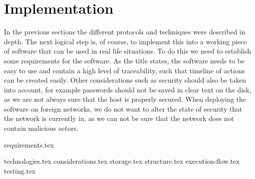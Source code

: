 \documentclass{article}
\begin{document}
\section{Implementation}
\label{sec:implementation}
In the previous sections the different protocols and techniques were described in depth. The next logical step is, of course, to implement this into a working piece of software that can be used in real life situations. To do this we need to establish some requirements for the software. As the title states, the software needs to be easy to use and contain a high level of traceability, such that timeline of actions can be created easily. Other considerations such as security should also be taken into account, for example passwords should not be saved in clear text on the disk, as we are not always sure that the host is properly secured. When deploying the software on foreign networks, we do not want to alter the state of security that the network is currently in, as we can not be sure that the network does not contain malicious actors.

{requirements.tex}

{technologies.tex}
{considerations.tex}
{storage.tex}
{structure.tex}
{execution-flow.tex}
{testing.tex}
\end{document}
